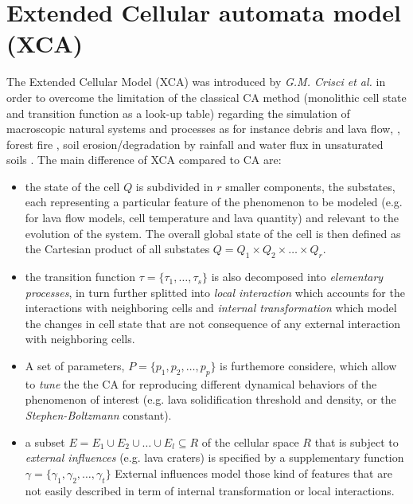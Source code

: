 \section{Extended Cellular automata model (XCA)}
The Extended Cellular Model (XCA) was introduced by \textit{G.M. Crisci et al.} in order to overcome the limitation of the classical CA method (monolithic cell state and transition function as a look-up table)  regarding the simulation of macroscopic natural systems and processes as for instance debris and lava flow, \cite{dambrosio2012,d2007parallel}, forest fire \cite{Trunfio:2011:NAS:2043635.2043641}, soil erosion/degradation by rainfall \cite{Ambrosio200133} and water flux in unsaturated soils \cite{Mendicino:2006}.
The main difference of XCA compared to CA are:
\begin{itemize}
		\item the state of the cell $Q$ is subdivided in $r$ smaller components, the substates, each representing a particular feature of the phenomenon to be modeled (e.g. for lava flow models, cell temperature and lava quantity) and relevant to the evolution of the system. The  overall global state of the cell is then defined as the Cartesian product of all substates $Q= Q_1 \times Q_2 \times \ldots \times Q_r$.
		\item the transition function $\tau=\{\tau_1, \ldots, \tau_s\} $ is also decomposed into \textit{elementary processes}, in turn further splitted into \textit{local interaction} which accounts for the interactions with neighboring cells  and \textit{internal transformation} which model the changes in cell state that are not consequence of any external interaction with neighboring cells. 
		\item A set of parameters, $P=\{p_1,p_2,\ldots,p_p\}$ is furthemore considere, which allow to \textit{tune} the the CA  for reproducing different dynamical behaviors of the phenomenon of interest (e.g. lava solidification threshold and density, or the \textit{Stephen-Boltzmann} constant).
		\item a subset $E = E_1 \cup E_2 \cup \ldots \cup E_l \subseteq R$ of the cellular space $R$ that is subject to \textit{external influences} (e.g. lava craters) is specified by a supplementary function $\gamma = \{\gamma_1, \gamma_2,\ldots,\gamma_t\}$ External influences model those kind of features that are not easily described in term of internal transformation or local interactions.
\end{itemize} 

